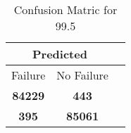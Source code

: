 \begin{table}[] 
\label{Table: Prediction Accuracy-DMD99.5OnlySunEKF-ignoreReflection-Reflection} 
\caption{Confusion Matric for 99.5} 
\centering 
\begin{tabular} 
 {@{}ccc@{}} 
\toprule 
\multicolumn{2}{c}{\textbf{Predicted}}
 \\ \midrule 
\multicolumn{1}{|c|}{Failure} & 
\multicolumn{1}{c|}{No Failure}
 \\ \midrule 
\multicolumn{1}{|c|}{\color{green}\textbf{84229}} & 
\multicolumn{1}{c|}{\color{red}\textbf{443}}
 \\ \midrule 
\multicolumn{1}{|c|}{\color{red}\textbf{395}} & 
\multicolumn{1}{c|}{\color{green}\textbf{85061}}
 \\ \bottomrule 
\end{tabular} 
\end{table} 
